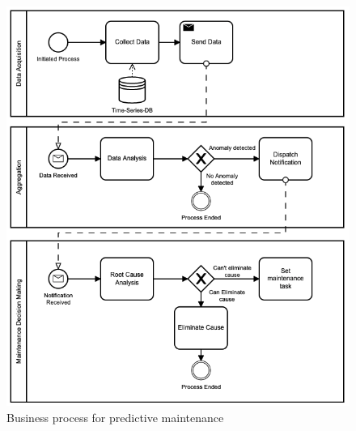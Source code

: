 \begin{figure}[h]
\centering
\includegraphics[width=.6\textwidth]{content/pictures/business_process_notation.png}
\caption{Business process for predictive maintenance}
\label{fig:pred-maintenance}
\end{figure}


